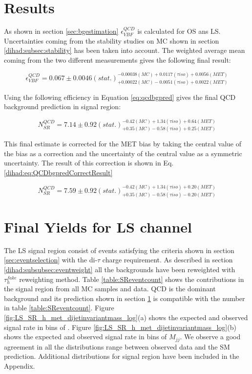 \section{Results}
\label{section:results}

As shown in section \ref{sec:bgestimation} $\epsilon^{QCD}_{VBF}$ is calculated for OS ans LS. Uncertainties coming from the stability studies on MC shown in section \ref{dihad:subsec:stability} has been taken into account. The weighted average mean coming from the two different measurements gives the following final result:

\begin{equation}
\epsilon^{QCD}_{VBF} = 0.067\pm0.0046(stat.)^{-0.00038(MC)+0.0117(\tau iso)+0.0056(MET)}_{+0.00022(MC)-0.0051(\tau iso)+0.0022(MET)}
\label{eq:vbfefflsresult}
\end{equation}

Using the following efficiency in Equation \ref{eq:qcdbgpred} gives the final QCD background prediction in signal region:

\begin{equation}
N^{QCD}_{SR} = 7.14\pm0.92(stat.)^{-0.42(MC)+1.34(\tau iso)+0.64(MET)}_{+0.35(MC)-0.58(\tau iso)+0.25(MET)}
\label{eq:QCDbgpredresult}
\end{equation}

This final estimate is corrected for the MET bias by taking the central value of the  bias as a correction and 
the uncertainty of the central value as a symmetric uncertainty. The result of this correction is shown in Eq.
\ref{dihad:eq:QCDbgpredCorrectResult}

\begin{equation}
N^{QCD}_{SR} = 7.59\pm0.92(stat.)^{-0.42(MC)+1.34(\tau iso)+0.20(MET)}_{+0.35(MC)-0.58(\tau iso)-0.20(MET)}
\label{dihad:eq:QCDbgpredCorrectResult}
\end{equation}

\section{Final Yields for LS channel}

The LS signal region consist of events satisfying the criteria shown in section \ref{sec:eventselection} with the di-$\tau$ charge requirement. As described in section \ref{dihad:subsubsec:eventweight} all the backgrounds have been reweighted with $\tau_{h}^{fake}$ reweighting method. Table \ref{table:SReventcount} shows the contributions in the signal region from all MC samples and data.  QCD is the dominant background and its prediction shown in section \ref{section:results} is compatible with the number in table \ref{table:SReventcount}. Figure \ref{fig:LS_SR_h_met_dijetinvariantmass_log}(a) shows the expected and observed signal rate in bins of \met. Figure \ref{fig:LS_SR_h_met_dijetinvariantmass_log}(b) shows the expected and observed signal rate in bins of $M_{jj}$. We observe a good agreement in all the distributions range between observed data and the SM prediction. Additional distributions for signal region have been included in the Appendix.

